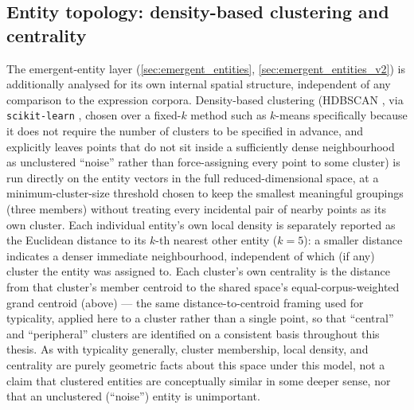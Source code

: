 \subsection{Entity topology: density-based clustering and centrality}\label{sec:entity_topology_methods}
The emergent-entity layer (\ref{sec:emergent_entities}, \ref{sec:emergent_entities_v2}) is additionally analysed for its own internal spatial structure, independent of any comparison to the expression corpora. Density-based clustering (HDBSCAN \autocite{mcinnesHdbscanHierarchicalDensity2017}, via \texttt{scikit-learn} \autocite{JMLR:v12:pedregosa11a}, chosen over a fixed-$k$ method such as $k$-means specifically because it does not require the number of clusters to be specified in advance, and explicitly leaves points that do not sit inside a sufficiently dense neighbourhood as unclustered \enquote{noise} rather than force-assigning every point to some cluster) is run directly on the entity vectors in the full reduced-dimensional space, at a minimum-cluster-size threshold chosen to keep the smallest meaningful groupings (three members) without treating every incidental pair of nearby points as its own cluster. Each individual entity's own local density is separately reported as the Euclidean distance to its $k$-th nearest other entity ($k=5$): a smaller distance indicates a denser immediate neighbourhood, independent of which (if any) cluster the entity was assigned to. Each cluster's own centrality is the distance from that cluster's member centroid to the shared space's equal-corpus-weighted grand centroid (above) — the same distance-to-centroid framing used for typicality, applied here to a cluster rather than a single point, so that \enquote{central} and \enquote{peripheral} clusters are identified on a consistent basis throughout this thesis. As with typicality generally, cluster membership, local density, and centrality are purely geometric facts about this space under this model, not a claim that clustered entities are conceptually similar in some deeper sense, nor that an unclustered (\enquote{noise}) entity is unimportant.

